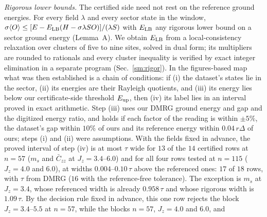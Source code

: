 \documentclass[aps,prx,onecolumn,10pt,nofootinbib,longbibliography,floatfix]{revtex4-2}
\theoremstyle{remark}
\newcommand{\Jz}{J_z}
\newcommand{\ms}{m_s}
\newcommand{\Czz}{\bar C_{zz}}
\begin{document}
\emph{Rigorous lower bounds.} The certified side need not rest on the reference ground energies. For every field
$\lambda$ and every sector state in the window, $\sigma\langle O\rangle\le[E-E_{\rm LB}(H-\sigma\lambda SO)]/(\lambda S)$
with $E_{\rm LB}$ any rigorous lower bound on a sector ground energy (Lemma~A). We obtain $E_{\rm LB}$ from a
local-consistency relaxation over clusters of five to nine sites, solved in dual form; its multipliers are rounded to %
rationals and every cluster inequality is verified by exact integer elimination in a separate program
(Sec.~\ref{sm:rigor}). In the figures-based map what was then established is a chain of conditions: if (i) the dataset's states lie in the sector,
(ii) its energies are their Rayleigh quotients, and (iii) its energy lies below our certificate-side threshold
$E_{\rm up}$, then (iv) its label lies in an interval proved in exact arithmetic. Step (iii)
uses our DMRG ground energy and gap and the digitized energy ratio, and holds if each factor of the reading is within %
$\pm5\%$, the dataset's gap within $10\%$ of ours and its reference energy within $0.04\,r\Delta$ of ours; steps (i) %
and (ii) were assumptions. With the fields fixed in advance, the proved interval of step (iv) is at most $\tau$ wide for $13$ of the $14$ certified rows at %
$n=57$ ($\ms$ and $\Czz$ at $\Jz=3.4$--$6.0$) and for all four rows tested at $n=115$ ($\Jz=4.0$ and $6.0$), at %
widths $0.004$--$0.10\,\tau$ above the referenced ones: $17$ of $18$ rows, with $\tau$ from DMRG ($16$ with the %
reference-free tolerance). The exception is $\ms$ at $\Jz=3.4$, whose %
referenced width is already $0.958\,\tau$ and whose rigorous width is $1.09\,\tau$. By the decision rule fixed in %
advance, this one row rejects the block $\Jz=3.4$--$5.5$ at $n=57$, while the blocks $n=57$, $\Jz=4.0$ and $6.0$, and %
\end{document}
